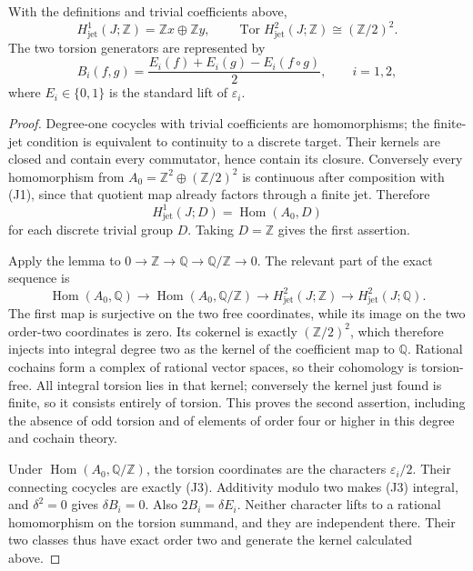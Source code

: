 \begin{proposition}\ours
With the definitions and trivial coefficients above,
\[
 H^1_{\mathrm{jet}}(J;\mathbb Z)=\mathbb Zx\oplus\mathbb Zy,
 \qquad
 \operatorname{Tor}H^2_{\mathrm{jet}}(J;\mathbb Z)
       \cong(\mathbb Z/2)^2.                 \tag{J2}
\]
The two torsion generators are represented by
\[
 B_i(f,g)=\frac{E_i(f)+E_i(g)-E_i(f\circ g)}2,
 \qquad i=1,2,                             \tag{J3}
\]
where \(E_i\in\{0,1\}\) is the standard lift of \(\varepsilon_i\).
\end{proposition}
\begin{proof}
Degree-one cocycles with trivial coefficients are homomorphisms; the
finite-jet condition is equivalent to continuity to a discrete target.
Their kernels are closed and contain every commutator, hence contain its
closure. Conversely every homomorphism from
\(A_0=\mathbb Z^2\oplus(\mathbb Z/2)^2\) is continuous after composition
with (J1), since that quotient map already factors through a finite jet.
Therefore
\[
 H^1_{\mathrm{jet}}(J;D)=\operatorname{Hom}(A_0,D)
\]
for each discrete trivial group \(D\). Taking \(D=\mathbb Z\) gives the
first assertion.

Apply the lemma to \(0\to\mathbb Z\to\mathbb Q\to\mathbb Q/\mathbb Z\to0\).
The relevant part of the exact sequence is
\[
 \operatorname{Hom}(A_0,\mathbb Q)\longrightarrow
 \operatorname{Hom}(A_0,\mathbb Q/\mathbb Z)\longrightarrow
 H^2_{\mathrm{jet}}(J;\mathbb Z)\longrightarrow
 H^2_{\mathrm{jet}}(J;\mathbb Q).
\]
The first map is surjective on the two free coordinates, while its image
on the two order-two coordinates is zero. Its cokernel is exactly
\((\mathbb Z/2)^2\), which therefore injects into integral degree two as
the kernel of the coefficient map to \(\mathbb Q\). Rational cochains
form a complex of rational vector spaces, so their cohomology is
torsion-free. All integral torsion lies in that kernel; conversely the
kernel just found is finite, so it consists entirely of torsion. This
proves the second assertion, including the absence of odd torsion and of
elements of order four or higher in this degree and cochain theory.

Under \(\operatorname{Hom}(A_0,\mathbb Q/\mathbb Z)\), the torsion
coordinates are the characters \(\varepsilon_i/2\). Their connecting
cocycles are exactly (J3). Additivity modulo two makes (J3) integral, and
\(\delta^2=0\) gives \(\delta B_i=0\). Also \(2B_i=\delta E_i\).
Neither character lifts to a rational homomorphism on the torsion summand,
and they are independent there. Their two classes thus have exact order
two and generate the kernel calculated above.
\end{proof}

